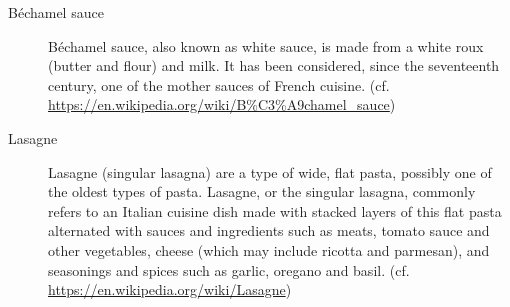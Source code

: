 \documentclass[a4paper]{article}
\begin{document}
\thispagestyle{empty}

\begin{description}
  \item [Béchamel sauce] Béchamel sauce, also known as white sauce, is made from a white roux (butter and flour) and milk. It has been considered, since the seventeenth century, one of the mother sauces of French cuisine. (cf. \url{https://en.wikipedia.org/wiki/B%C3%A9chamel_sauce})
  \item [Lasagne] Lasagne (singular lasagna) are a type of wide, flat pasta, possibly one of the oldest types of pasta. Lasagne, or the singular lasagna, commonly refers to an Italian cuisine dish made with stacked layers of this flat pasta alternated with sauces and ingredients such as meats, tomato sauce and other vegetables, cheese (which may include ricotta and parmesan), and seasonings and spices such as garlic, oregano and basil. (cf. \url{https://en.wikipedia.org/wiki/Lasagne})
\end{description}
\end{document}
